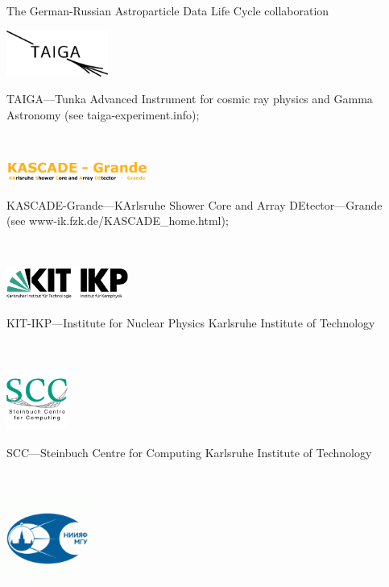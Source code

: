 \documentclass[18pt]{beamer}
\begin{document}
\begin{frame}[allowframebreaks]
{The German-Russian Astroparticle Data Life Cycle collaboration}
\parbox{0.35\textwidth}{
  \centering\includegraphics[width=0.25\textwidth]{pics/taiga-logo.png}
}\hfill
\parbox{0.60\textwidth}{
  TAIGA---Tunka Advanced Instrument for cosmic ray physics and Gamma Astronomy (see
  taiga-experiment.info);
}
\\\vspace{1em}
\parbox{0.35\textwidth}{
  \centering\includegraphics[width=0.35\textwidth]{pics/grande.png}
}\hfill
\parbox{0.60\textwidth}{
  KASCADE-Grande---KArlsruhe Shower Core and Array DEtector---Grande\\ (see
  www-ik.fzk.de/KASCADE\_home.html);
}
\\\vspace{1em}
\parbox{0.35\textwidth}{
  \centering\includegraphics[width=0.30\textwidth]{pics/Logo_KIT_IKP.pdf}
}\hfill
\parbox{0.60\textwidth}{
  KIT-IKP---Institute for Nuclear Physics Karlsruhe Institute of Technology
}
\\\vspace{1em}
\parbox{0.35\textwidth}{
  \centering\includegraphics[width=0.15\textwidth]{pics/SCC-Logo.png}
}\hfill
\parbox{0.60\textwidth}{
  SCC---Steinbuch Centre for Computing Karlsruhe Institute of Technology
}
\\\vspace{1em}
\parbox{0.20\textwidth}{
  \centering\includegraphics[width=0.20\textwidth]{pics/snip_msu_logo.png}
}
\end{frame}
\end{document}
